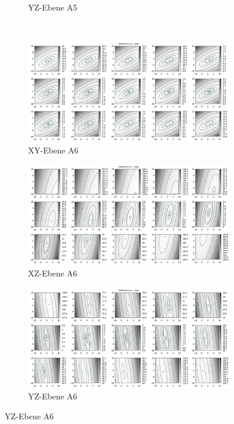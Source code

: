 \begin{appendix}
\begin{landscape}
\begin{figure}[!ht]
\begin{subfigure}[t]{0.5\textwidth}
					\caption{YZ-Ebene A5}
		\end{subfigure}
	\\
		\centering
		\begin{subfigure}[t]{0.5\textwidth}
		     \centering
		     \includegraphics[width=\textwidth]{img/fitness/xy/a5.png}
		             \caption{XY-Ebene A6}
		\end{subfigure}
		\begin{subfigure}[t]{0.5\textwidth}
			\centering
		     \includegraphics[width=\textwidth]{img/fitness/xz/a5.png}
					\caption{XZ-Ebene A6}
		\end{subfigure}
		\begin{subfigure}[t]{0.5\textwidth}
				\centering
		   \includegraphics[width=\textwidth]{img/fitness/yz/a5.png}
					\caption{YZ-Ebene A6}
		\end{subfigure}
\end{figure}
%
\newpage
%

\end{landscape}
\end{appendix}
